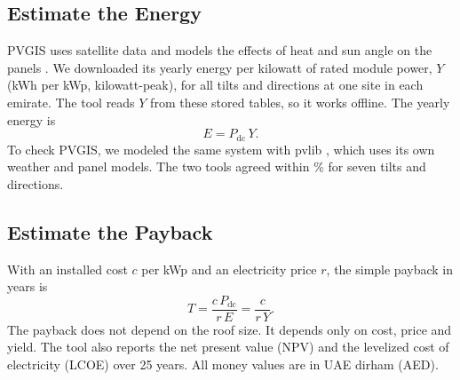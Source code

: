 \documentclass[conference]{IEEEtran}
\begin{document}
\subsection{Estimate the Energy}
PVGIS uses satellite data and models the effects of heat and sun angle on the panels \cite{huld2012}. We downloaded its yearly energy per kilowatt of rated module power, $Y$ (kWh per kWp, kilowatt-peak), for all tilts and directions at one site in each emirate. The tool reads $Y$ from these stored tables, so it works offline. The yearly energy is
\begin{equation}
E = P_{\mathrm{dc}}\,Y .
\end{equation}
To check PVGIS, we modeled the same system with pvlib \cite{holmgren2018}, which uses its own weather and panel models. The two tools agreed within \PvlibMax\% for seven tilts and directions.

\subsection{Estimate the Payback}
With an installed cost $c$ per kWp and an electricity price $r$, the simple payback in years is
\begin{equation}
T = \frac{c\,P_{\mathrm{dc}}}{r\,E} = \frac{c}{r\,Y} .
\label{eq:payback}
\end{equation}
The payback does not depend on the roof size. It depends only on cost, price and yield. The tool also reports the net present value (NPV) and the levelized cost of electricity (LCOE) over 25 years. All money values are in UAE dirham (AED).
\end{document}
